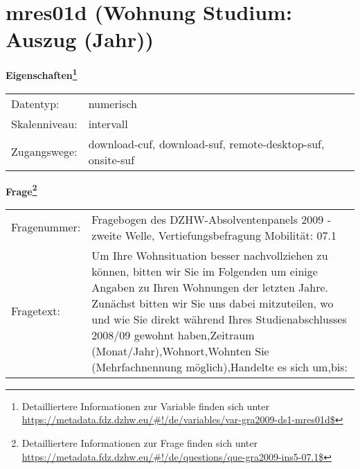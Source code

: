 
    \setcounter{footnote}{0}

    \vspace*{-1.8cm}
	\section{mres01d (Wohnung Studium: Auszug (Jahr))}
	\label{section:mres01d}



    \vspace*{0.5cm}
    \noindent\textbf{Eigenschaften\footnote{Detailliertere Informationen zur Variable finden sich unter
		\url{https://metadata.fdz.dzhw.eu/\#!/de/variables/var-gra2009-ds1-mres01d$}}}\\
	\begin{tabularx}{\hsize}{@{}lX}
	Datentyp: & numerisch \\
	Skalenniveau: & intervall \\
	Zugangswege: &
	  download-cuf, 
	  download-suf, 
	  remote-desktop-suf, 
	  onsite-suf
 \\
    \end{tabularx}



				\vspace*{0.5cm}
                \noindent\textbf{Frage\footnote{Detailliertere Informationen zur Frage finden sich unter
		              \url{https://metadata.fdz.dzhw.eu/\#!/de/questions/que-gra2009-ins5-07.1$}}}\\
				\begin{tabularx}{\hsize}{@{}lX}
					Fragenummer: &
					  Fragebogen des DZHW-Absolventenpanels 2009 - zweite Welle, Vertiefungsbefragung Mobilität:
					  07.1
 \\
					Fragetext: & Um Ihre Wohnsituation besser nachvollziehen zu können, bitten wir Sie im Folgenden um einige Angaben zu Ihren Wohnungen der letzten Jahre. Zunächst bitten wir Sie uns dabei mitzuteilen, wo und wie Sie direkt während Ihres Studienabschlusses 2008/09 gewohnt haben,Zeitraum (Monat/Jahr),Wohnort,Wohnten Sie (Mehrfachnennung möglich),Handelte es sich um,bis: \\
				\end{tabularx}





